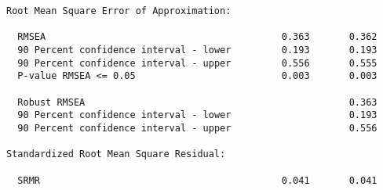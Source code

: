 \begin{verbatim}
Root Mean Square Error of Approximation:

  RMSEA                                          0.363       0.362
  90 Percent confidence interval - lower         0.193       0.193
  90 Percent confidence interval - upper         0.556       0.555
  P-value RMSEA <= 0.05                          0.003       0.003
                                                                  
  Robust RMSEA                                               0.363
  90 Percent confidence interval - lower                     0.193
  90 Percent confidence interval - upper                     0.556

Standardized Root Mean Square Residual:

  SRMR                                           0.041       0.041
\end{verbatim}

